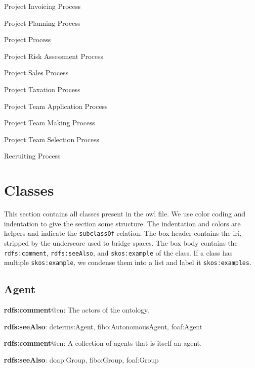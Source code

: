 \documentclass[a4paper, DIV=13, BCOR=0cm]{scrbook}
\newcommand{\relation}[1]{\texttt{#1}}
\newcommand{\prop}[1]{\texttt{#1}}
\begin{document}
\begin{multicols}{2}
\begin{compactitem}
\begin{compactitem}
			\item Project Invoicing Process
			\item Project Planning Process
			\item Project Process
			\item Project Risk Assessment Process
			\item Project Sales Process
			\item Project Taxation Process
			\item Project Team Application Process
			\item Project Team Making Process
			\item Project Team Selection Process
			\item Recruiting Process
		\end{compactitem}
	\end{compactitem}
\end{multicols}
\section{Classes }
This section contains all classes present in the \gls{owl} file. We use color 
coding and indentation to give the section some structure. The indentation and 
colors are helpers and indicate the \relation{subclassOf} relation. The box 
header contains the \gls{iri}, stripped by the underscore used to bridge spaces. 
The box body contains the \prop{rdfs:comment}, \prop{rdfs:seeAlso}, and 
\prop{skos:example} of the class. If a class has multiple 
\relation{skos:example}, we condense them into a list and label it 
\relation{skos:examples}.

\subsection{Agent}
\begin{mdframed}[style=onto, frametitle={Agent}]
	{%
		\begin{compactitem}
			\item \textbf{rdfs:comment}@en: The actors of the ontology.
			\item \textbf{rdfs:seeAlso}: dcterms:Agent, fibo:AutonomousAgent, foaf:Agent
		\end{compactitem}
	} %
\end{mdframed}

\begin{mdframed}[style=onto-1, frametitle={Group}]
	{%
		\begin{compactitem}
			\item \textbf{rdfs:comment}@en: A collection of agents that is itself an agent.
			\item \textbf{rdfs:seeAlso}: doap:Group, fibo:Group, foaf:Group
		\end{compactitem}
	} %
\end{mdframed}
\end{document}
